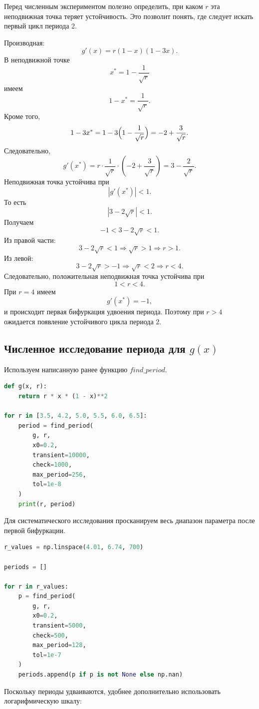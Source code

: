 \documentclass[14pt,a4paper]{extarticle}
\begin{document}
Перед численным экспериментом полезно определить, при каком $r$ эта неподвижная точка теряет устойчивость. Это позволит понять, где следует искать первый цикл периода 2.

Производная:
\[
g'(x) = r(1 - x)(1 - 3x).
\]
В неподвижной точке
\[
x^* = 1 - \frac{1}{\sqrt{r}}
\]
имеем
\[
1 - x^* = \frac{1}{\sqrt{r}}.
\]
Кроме того,
\[
1 - 3x^* = 1 - 3 \Bigl( 1 - \frac{1}{\sqrt{r}} \Bigr) = -2 + \frac{3}{\sqrt{r}}.
\]
Следовательно,
\[
g'(x^*) = r \cdot \frac{1}{\sqrt{r}} \cdot (-2 + \frac{3}{\sqrt{r}}) = 3 - \frac{2}{\sqrt{r}}.
\]
Неподвижная точка устойчива при
\[
|g'(x^*)| < 1.
\]
То есть
\[
|3 - 2\sqrt{r}|<1.
\]
Получаем
\[
-1 < 3 - 2\sqrt{r} < 1.
\]
Из правой части:
\[
3 - 2\sqrt{r} < 1 \Rightarrow \sqrt{r} > 1 \Rightarrow r > 1.
\]
Из левой:
\[
3 - 2\sqrt{r} > -1 \Rightarrow \sqrt{r} < 2 \Rightarrow r < 4.
\]
Следовательно, положительная неподвижная точка устойчива при
\[
1 < r < 4.
\]
При $r = 4$ имеем
\[
g'(x^*) = -1,
\]
и происходит первая бифуркация удвоения периода. Поэтому при $r > 4$ ожидается появление устойчивого цикла периода 2.


\subsection{Численное исследование периода для $g(x)$}

Используем написанную ранее функцию $find\_period$.

\begin{lstlisting}[language=python]
def g(x, r):
    return r * x * (1 - x)**2

for r in [3.5, 4.2, 5.0, 5.5, 6.0, 6.5]:
    period = find_period(
        g, r,
        x0=0.2,
        transient=10000,
        check=1000,
        max_period=256,
        tol=1e-8
    )
    print(r, period)
\end{lstlisting}
Для систематического исследования просканируем весь диапазон параметра после первой бифуркации.

\begin{lstlisting}[language=python]
r_values = np.linspace(4.01, 6.74, 700)

periods = []

for r in r_values:
    p = find_period(
        g, r,
        x0=0.2,
        transient=5000,
        check=500,
        max_period=128,
        tol=1e-7
    )
    periods.append(p if p is not None else np.nan)
\end{lstlisting}
Поскольку периоды удваиваются, удобнее дополнительно использовать логарифмическую шкалу:
\end{document}

